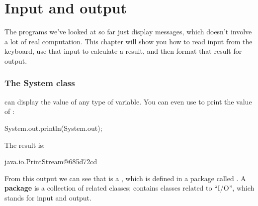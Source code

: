 \chapter{Input and output}




The programs we've looked at so far just display messages, which doesn't involve a lot of real computation.
This chapter will show you how to read input from the keyboard, use that input to calculate a result, and then format that result for output.


\subsection{The System class}
\label{sec:system}

 can display the value of any type of variable.
You can even use  to print the value of :

\begin{code}
System.out.println(System.out);
\end{code}

The result is:

\begin{stdout}
java.io.PrintStream@685d72cd
\end{stdout}


From this output we can see that
 is a , which is defined in a
package called .  A {\bf package} is a collection of
related classes;  contains classes related to ``I/O'',
which stands for input and output.

